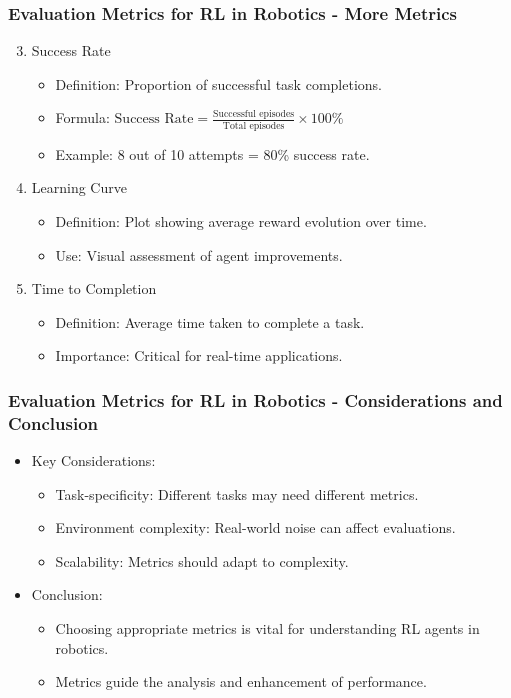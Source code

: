 \documentclass{beamer}
\begin{document}
\begin{frame}[fragile]
    \frametitle{Evaluation Metrics for RL in Robotics - More Metrics}
    \begin{enumerate}
        \setcounter{enumi}{2} %
        \item Success Rate
        \begin{itemize}
            \item Definition: Proportion of successful task completions.
            \item Formula: $\text{Success Rate} = \frac{\text{Successful episodes}}{\text{Total episodes}} \times 100\%$
            \item Example: 8 out of 10 attempts = 80\% success rate.
        \end{itemize}

        \item Learning Curve
        \begin{itemize}
            \item Definition: Plot showing average reward evolution over time.
            \item Use: Visual assessment of agent improvements.
        \end{itemize}

        \item Time to Completion
        \begin{itemize}
            \item Definition: Average time taken to complete a task.
            \item Importance: Critical for real-time applications.
        \end{itemize}
    \end{enumerate}
\end{frame}

\begin{frame}[fragile]
    \frametitle{Evaluation Metrics for RL in Robotics - Considerations and Conclusion}
    \begin{itemize}
        \item Key Considerations:
        \begin{itemize}
            \item Task-specificity: Different tasks may need different metrics.
            \item Environment complexity: Real-world noise can affect evaluations.
            \item Scalability: Metrics should adapt to complexity.
        \end{itemize}
        
        \item Conclusion:
        \begin{itemize}
            \item Choosing appropriate metrics is vital for understanding RL agents in robotics.
            \item Metrics guide the analysis and enhancement of performance.
        \end{itemize}
    \end{itemize}
\end{frame}
\end{document}
